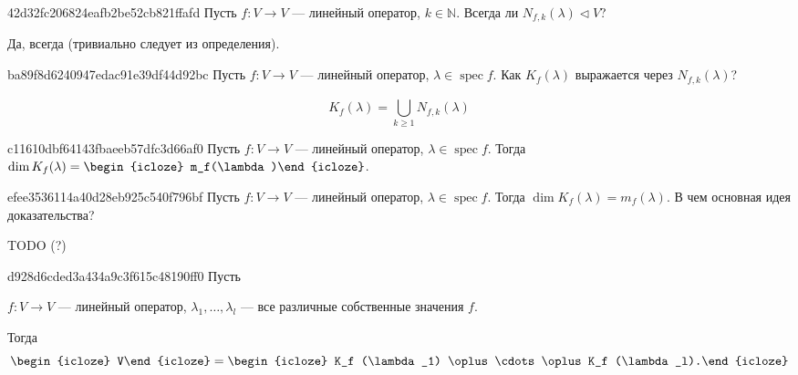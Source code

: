 \begin{note}{42d32fc206824eafb2be52cb821ffafd}
    Пусть \( f : V \to V \) --- линейный оператор, \( k \in \mathbb N \).
    Всегда ли \( N_{f,k}(\lambda) \triangleleft V \)?

    \begin{cloze}{1}
        Да, всегда (тривиально следует из определения).
    \end{cloze}
\end{note}

\begin{note}{ba89f8d6240947edac91e39df44d92bc}
    Пусть \( f : V \to V \) --- линейный оператор, \( \lambda \in \operatorname{spec} f \).
    Как \( K_f(\lambda) \) выражается через \( N_{f,k} (\lambda) \)?

    \begin{cloze}{1}
        \[
            K_f(\lambda) = \bigcup_{k \geqslant 1}^{} N_{f,k}(\lambda)
        \]
    \end{cloze}
\end{note}

\begin{note}{c11610dbf64143fbaeeb57dfc3d66af0}
    Пусть \( f : V \to V \) --- линейный оператор, \( \lambda \in \operatorname{spec} f \).
    Тогда \( \dim K_f(\lambda) = \begin{icloze}{1}m_f(\lambda)\end{icloze} \).
\end{note}

\begin{note}{efee3536114a40d28eb925c540f796bf}
    Пусть \( f : V \to V \) --- линейный оператор, \( \lambda \in \operatorname{spec} f \).
    Тогда \( \dim K_f(\lambda) = m_f(\lambda) \).
    В чем основная идея доказательства?

    TODO (?)
\end{note}

\begin{note}{d928d6cded3a434a9c3f615c48190ff0}
    Пусть \begin{icloze}{3}\( f : V \to V \) --- линейный оператор, \( \lambda_1, \ldots, \lambda_l \) --- все различные собственные значения \( f \).\end{icloze}
    Тогда
    \[
        \begin{icloze}{2}V\end{icloze} = \begin{icloze}{1}K_f (\lambda_1) \oplus \cdots \oplus K_f (\lambda_l).\end{icloze}
    \]
\end{note}

